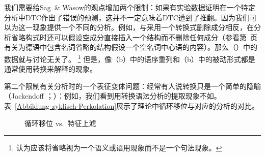 我们需要给Sag~\& Wasow的观点增加两个限制：如果有实验数据证明在一个特定分析中DTC作出了错误的预测，这并不一定意味着DTC遭到了推翻。因为我们可以为这一现象提供一个不同的分析。例如，与采用一个转换式删除成分相反，在分析省略构式时还可以假设空成分直接插入一个结构而不删除任何成分（参看第~\pageref{np-epsilon}页有关为德语中包含名词省略的结构假设一个空名词中心语的内容）。那么（）中的数据就与讨论无关了。 
\footnote{%
 \citet[\S~1, \S~7]{CJ2005a}认为应该将省略视为一个语义或语用现象而不是一个句法现象。 
} 但是，像（b）中的语序重列和（b）中的被动形式都是通常使用转换来解释的现象。

第二个限制有关分析时的一个表征变体问题：经常有人说转换只是一个简单的隐喻（Jackendoff \citeyear[--23]{Jackendoff2000a}；\citeyear[, 20]{Jackendoff2007a}）：例如，我们看到用转换语法分析的提取现象不如\hpsgc。表~\vref{Abbildung-zyklisch-Perkolation}展示了\gbc 理论中循环移位与对应的\hpsgc 分析的对比。
\begin{figure}
\hfill%
\hfill
{}
\hfill\mbox{}%
\caption{循环移位 vs.\ 特征上滤}\label{Abbildung-zyklisch-Perkolation}
\end{figure}%

